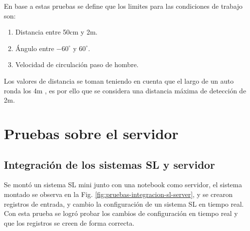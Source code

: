 En base a estas pruebas se define que los limites para las condiciones de trabajo son:
\begin{enumerate}
    \item Distancia entre 50cm y 2m.
    \item Ángulo entre $-60^\circ$ y $60^\circ$.
    \item Velocidad de circulación paso de hombre.
\end{enumerate}
Los valores de distancia se toman teniendo en cuenta que el largo de un auto ronda los 4m \cite{duran_que_2023}, es por ello que se considera una distancia máxima de detección de 2m.
\section{Pruebas sobre el servidor}

\subsection{Integración de los sistemas SL y servidor}

Se montó un sistema SL mini junto con una notebook como servidor, el sistema montado se observa en la Fig. \ref{fig:pruebas-integracion-sl-server}, y se crearon registros de entrada, y cambio la configuración de un sistema SL en tiempo real. Con esta prueba se logró probar los cambios de configuración en tiempo real y que los registros se creen de forma correcta.


